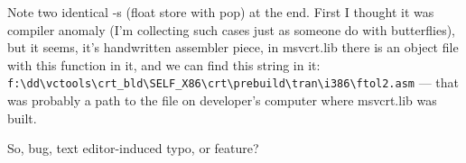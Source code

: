 Note two identical -s (float store with pop) at the end. 
First I thought it was compiler anomaly (I'm collecting such cases just as someone do with butterflies),
but it seems, it's handwritten assembler piece, in msvcrt.lib there is an object file with this function in it,
and we can find this string in it:
\verb|f:\dd\vctools\crt_bld\SELF_X86\crt\prebuild\tran\i386\ftol2.asm| ---
that was probably a path to the file on developer's computer where msvcrt.lib was built.

So, bug, text editor-induced typo, or feature?

